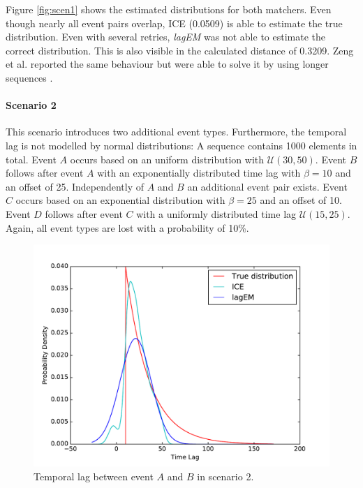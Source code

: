 \documentclass[conference]{IEEEtran}
\theoremstyle{examplestyle}
\begin{document}
Figure \ref{fig:scen1} shows the estimated distributions for both matchers. Even though nearly all event pairs overlap, \ac{ICE} (0.0509) is able to estimate the true distribution. Even with several retries, \textit{lagEM} was not able to estimate the correct distribution. This is also visible in the calculated distance of 0.3209. Zeng et al. reported the same behaviour but were able to solve it by using longer sequences \cite{Zeng2015}.



\paragraph{Scenario 2}
This scenario introduces two additional event types. Furthermore, the temporal lag is not modelled by normal distributions: A sequence contains 1000 elements in total. Event \(A\) occurs based on an uniform distribution with \(\mathcal{U}(30, 50)\). Event \(B\) follows after event \(A\) with an exponentially distributed time lag with \(\beta = 10\) and an offset of 25. Independently of \(A\) and \(B\) an additional event pair exists. Event \(C\) occurs based on an exponential distribution with \(\beta = 25\) and an offset of 10. Event \(D\) follows after event \(C\) with a uniformly distributed time lag \(\mathcal{U}(15, 25)\). Again, all event types are lost with a probability of 10\%.


\begin{figure}[!htb]
	\centering
	\includegraphics[scale=0.4]{images/scenarios/2-AB.pdf}
	\caption{Temporal lag between event \(A\) and \(B\) in scenario 2.}
	\label{fig:scen2-1}	
\end{figure}
\end{document}
